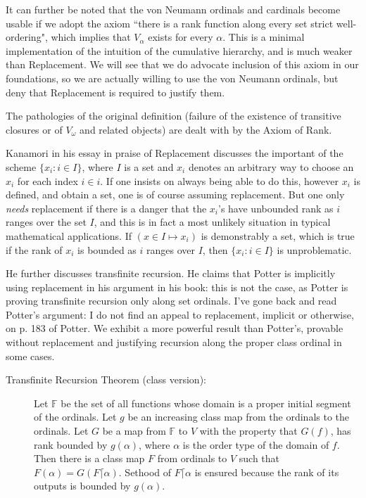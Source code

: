 \documentclass[12pt]{article}
\begin{document}
It can further be noted that the von Neumann ordinals and cardinals become usable if we adopt the axiom ``there is a rank function along every set strict well-ordering", which implies that $V_{\alpha}$ exists for every $\alpha$.  This is a minimal implementation of the intuition of the cumulative hierarchy, and is much weaker than Replacement.  We will see that we do advocate inclusion of this axiom in our foundations, so we are actually willing to use the von Neumann ordinals, but deny that Replacement is required to justify them.

The pathologies of the original definition (failure of the existence of transitive closures or of $V_{\omega}$ and related objects) are dealt with by the Axiom of Rank.

Kanamori in his essay in praise of Replacement discusses the important of the scheme $\{x_i :i \in I\}$, where $I$ is a set and $x_i$ denotes an arbitrary way to choose an $x_i$ for each index $i \in i$.   If one insists on always being able to do this, however $x_i$ is defined, and obtain a set, one is of course assuming replacement.  But one only {\em needs\/} replacement if there is a danger that the  $x_i$'s have unbounded rank as $i$ ranges over the set $I$, and this is in fact a most unlikely situation in typical mathematical applications.  If $(x \in I \mapsto x_i)$ is demonstrably a set, which is true if the rank of $x_i$ is bounded as $i$ ranges over $I$, then $\{x_i :i \in I\}$ is unproblematic.

He further discusses transfinite recursion.  He claims that Potter is implicitly using replacement in his argument in his book:  this is not the case, as Potter is proving transfinite recursion only along set ordinals.   I've gone back and read Potter's argument:  I do not find an appeal to replacement, implicit or otherwise, on p. 183 of Potter.  We exhibit a more powerful result than Potter's, provable without replacement and justifying recursion along the proper class ordinal in some cases.

\begin{description}

\item[Transfinite Recursion Theorem (class version):]  Let $\mathbb F$ be the set of all functions whose domain is a proper initial segment of the ordinals.  Let $g$ be an increasing  class map from the ordinals to the ordinals.
Let $G$ be a map from $\mathbb F$ to $V$ with the property that $G(f)$, has rank bounded by $g(\alpha)$, where $\alpha$ is the order type of the domain of $f$.  Then there is a class map $F$ from ordinals to $V$ such that $F(\alpha) = G(F \lceil \alpha)$.  Sethood of $F \lceil \alpha$ is ensured
because the rank of its outputs is bounded by $g(\alpha)$.

\end{description}
\end{document}
